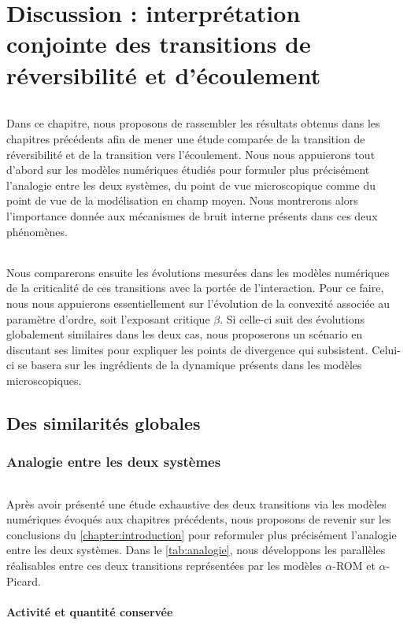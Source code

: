 \chapter{Discussion : interprétation conjointe des transitions de réversibilité et d'écoulement}

\label{chapter:discussion}

\subparagraph{}Dans ce chapitre, nous proposons de rassembler les résultats obtenus dans les chapitres précédents afin de mener une étude comparée de la transition de réversibilité et de la transition vers l'écoulement. Nous nous appuierons tout d'abord sur les modèles numériques étudiés pour formuler plus précisément l'analogie entre les deux systèmes, du point de vue microscopique comme du point de vue de la modélisation en champ moyen. Nous montrerons alors l'importance donnée aux mécanismes de bruit interne présents dans ces deux phénomènes.

\subparagraph{}Nous comparerons ensuite les évolutions mesurées dans les modèles numériques de la criticalité de ces transitions avec la portée de l'interaction. Pour ce faire, nous nous appuierons essentiellement sur l'évolution de la convexité associée au paramètre d'ordre, soit l'exposant critique $\beta$. Si celle-ci suit des évolutions globalement similaires dans les deux cas, nous proposerons un scénario en discutant ses limites pour expliquer les points de divergence qui subsistent. Celui-ci se basera sur les ingrédients de la dynamique présents dans les modèles microscopiques.

\section{Des similarités globales}

\subsection{Analogie entre les deux systèmes}

\subparagraph{}Après avoir présenté une étude exhaustive des deux transitions via les modèles numériques évoqués aux chapitres précédents, nous proposons de revenir sur les conclusions du \autoref{chapter:introduction} pour reformuler plus précisément l'analogie entre les deux systèmes. Dans le \autoref{tab:analogie}, nous développons les parallèles réalisables entre ces deux transitions représentées par les modèles $\alpha$-ROM et $\alpha$-Picard.

\subsubsection{Activité et quantité conservée}

